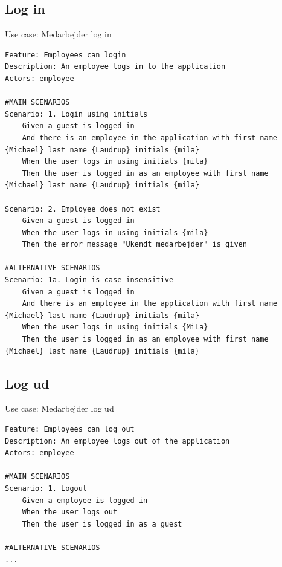 \subsection{Log in} 
\begin{listing}[H]
    \centering
    \caption{Use case: Medarbejder log in}\label{lst:usecase_login}
    \begin{verbatim}  
Feature: Employees can login
Description: An employee logs in to the application
Actors: employee

#MAIN SCENARIOS
Scenario: 1. Login using initials
    Given a guest is logged in
    And there is an employee in the application with first name {Michael} last name {Laudrup} initials {mila} 
    When the user logs in using initials {mila} 
    Then the user is logged in as an employee with first name {Michael} last name {Laudrup} initials {mila} 

Scenario: 2. Employee does not exist
    Given a guest is logged in
    When the user logs in using initials {mila} 
    Then the error message "Ukendt medarbejder" is given 

#ALTERNATIVE SCENARIOS
Scenario: 1a. Login is case insensitive
    Given a guest is logged in
    And there is an employee in the application with first name {Michael} last name {Laudrup} initials {mila} 
    When the user logs in using initials {MiLa} 
    Then the user is logged in as an employee with first name {Michael} last name {Laudrup} initials {mila} 
    \end{verbatim}
\end{listing}

\subsection{Log ud} 
\begin{listing}[H]
    \centering
    \caption{Use case: Medarbejder log ud}\label{lst:usecase_logout}
    \begin{verbatim}  
Feature: Employees can log out
Description: An employee logs out of the application
Actors: employee

#MAIN SCENARIOS
Scenario: 1. Logout
    Given a employee is logged in
    When the user logs out
    Then the user is logged in as a guest

#ALTERNATIVE SCENARIOS
...
    \end{verbatim}
\end{listing}

